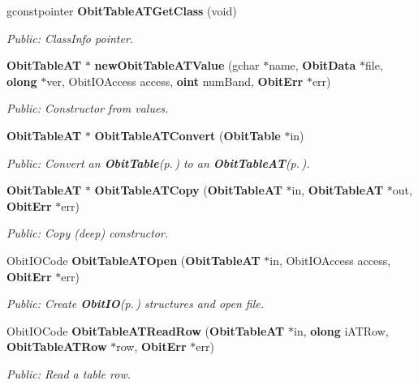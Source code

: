 \begin{CompactItemize}
gconstpointer {\bf Obit\-Table\-ATGet\-Class} (void)
\begin{CompactList}\small\item\em Public: Class\-Info pointer. \item\end{CompactList}\item 
{\bf Obit\-Table\-AT} $\ast$ {\bf new\-Obit\-Table\-ATValue} (gchar $\ast$name, {\bf Obit\-Data} $\ast$file, {\bf olong} $\ast$ver, Obit\-IOAccess access, {\bf oint} num\-Band, {\bf Obit\-Err} $\ast$err)
\begin{CompactList}\small\item\em Public: Constructor from values. \item\end{CompactList}\item 
{\bf Obit\-Table\-AT} $\ast$ {\bf Obit\-Table\-ATConvert} ({\bf Obit\-Table} $\ast$in)
\begin{CompactList}\small\item\em Public: Convert an {\bf Obit\-Table}{\rm (p.\,\pageref{structObitTable})} to an {\bf Obit\-Table\-AT}{\rm (p.\,\pageref{structObitTableAT})}. \item\end{CompactList}\item 
{\bf Obit\-Table\-AT} $\ast$ {\bf Obit\-Table\-ATCopy} ({\bf Obit\-Table\-AT} $\ast$in, {\bf Obit\-Table\-AT} $\ast$out, {\bf Obit\-Err} $\ast$err)
\begin{CompactList}\small\item\em Public: Copy (deep) constructor. \item\end{CompactList}\item 
Obit\-IOCode {\bf Obit\-Table\-ATOpen} ({\bf Obit\-Table\-AT} $\ast$in, Obit\-IOAccess access, {\bf Obit\-Err} $\ast$err)
\begin{CompactList}\small\item\em Public: Create {\bf Obit\-IO}{\rm (p.\,\pageref{structObitIO})} structures and open file. \item\end{CompactList}\item 
Obit\-IOCode {\bf Obit\-Table\-ATRead\-Row} ({\bf Obit\-Table\-AT} $\ast$in, {\bf olong} i\-ATRow, {\bf Obit\-Table\-ATRow} $\ast$row, {\bf Obit\-Err} $\ast$err)
\begin{CompactList}\small\item\em Public: Read a table row. \item\end{CompactList}\item 

\end{CompactItemize}
